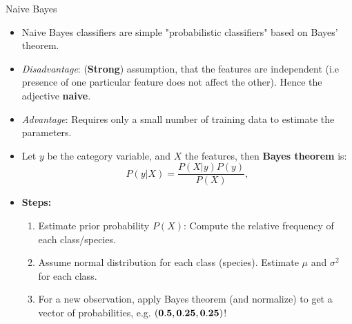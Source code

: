 \documentclass[aspectratio=1610, t]{beamer}\usepackage[]{graphicx}\usepackage[]{color}
\begin{document}
\begin{frame}{Naive Bayes}
\begin{itemize}
\item Naive Bayes classifiers are simple "probabilistic classifiers" based on Bayes' theorem.
\item \textit{Disadvantage}: (\textbf{Strong}) assumption, that the features are independent (i.e presence of one particular feature does not affect the other). Hence the adjective \textbf{naive}.
\item \textit{Advantage}: Requires only a small number of training data to estimate the parameters.
\item Let $y$ be the category variable, and $X$ the features, then \textcolor{wublue}{\textbf{Bayes theorem}} is:
$$P(y|X) = \frac{P(X|y)P(y)}{P(X)},$$

\item \textcolor{wublue}{\textbf{Steps:}}
\begin{enumerate}\small
  \item Estimate prior probability $P(X)$: Compute the relative frequency of each class/species.
  \item Assume normal distribution for each class (species). Estimate $\mu$ and $\sigma^2$ for each class.
  \item For a new observation, apply Bayes theorem (and normalize) to get a vector of probabilities, e.g. $(\bf{0.5},0.25,0.25)$!
\end{enumerate}
\end{itemize}
\end{frame}
\end{document}
